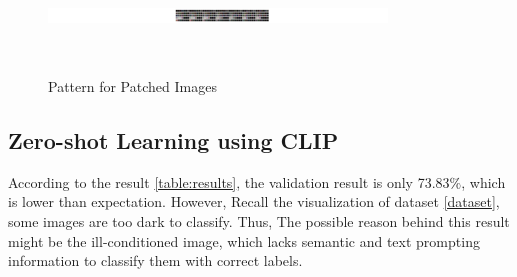 \documentclass[10pt,twocolumn,letterpaper]{article}
\begin{document}
\begin{figure}[h]
\centering
\includegraphics[width = 90mm,height = 30mm]{ProgressReport/image_patch-2.pdf}
\caption{Pattern for Patched Images}
\label{image patch}
\end{figure}
\subsection{Zero-shot Learning using CLIP}
According to the result \ref{table:results}, the validation result is only 73.83$\%$, which is lower than expectation. However, Recall the visualization of dataset \ref{dataset}, some images are too dark to classify. Thus, The possible reason behind this result might be the ill-conditioned image, which lacks semantic and text prompting information to classify them with correct labels. 
\end{document}
